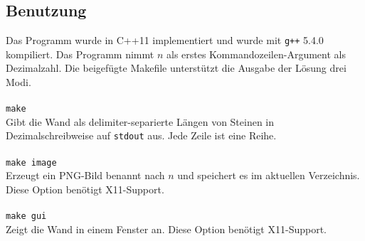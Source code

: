 \documentclass[a4paper, 12pt]{scrartcl}
\begin{document}
\subsection*{Benutzung}
Das Programm wurde in C++11 implementiert und wurde mit \texttt{g++} 5.4.0 kompiliert. Das Programm nimmt $n$ als erstes Kommandozeilen-Argument als Dezimalzahl. Die beigefügte Makefile unterstützt die Ausgabe der Lösung drei Modi. \\\\
\texttt{make} \\
Gibt die Wand als delimiter-separierte Längen von Steinen in Dezimalschreibweise auf \texttt{stdout} aus. Jede Zeile ist eine Reihe.\\\\
\texttt{make image} \\
Erzeugt ein PNG-Bild benannt nach $n$ und speichert es im aktuellen Verzeichnis. Diese Option benötigt X11-Support.\\\\
\texttt{make gui} \\
Zeigt die Wand in einem Fenster an. Diese Option benötigt X11-Support.\\
\end{document}
